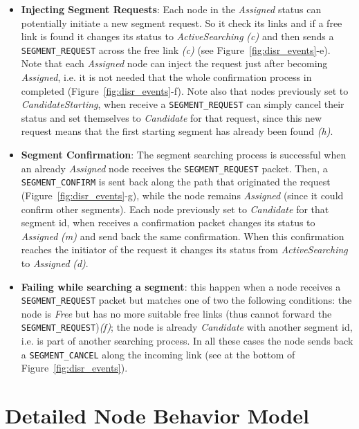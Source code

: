 \begin{itemize}
\item{\textbf{Injecting Segment Requests}}: Each node in the
\emph{Assigned} status can potentially initiate a new segment request.
So it check its links and if a free link is found it changes its
status to \emph{ActiveSearching} \emph{(c)} and then sends
a \texttt{SEGMENT\_REQUEST} across the free link \emph{(c)} (see
Figure~\ref{fig:disr_events}-e). 
Note that each \emph{Assigned} node can inject the request just after
becoming \emph{Assigned}, i.e. it is not needed that the whole confirmation
process in completed (Figure~\ref{fig:disr_events}-f).
Note also that nodes previously set to \emph{CandidateStarting}, when receive
a \texttt{SEGMENT\_REQUEST} can simply cancel their
status and set themselves to \emph{Candidate} for that request, since this new
request means that the first starting segment has already been found \emph{(h)}. 

\item{\textbf{Segment Confirmation}}: The segment searching process is
successful when an already \emph{Assigned} node receives the
\texttt{SEGMENT\_REQUEST} packet. Then, a \texttt{SEGMENT\_CONFIRM} is
sent back along the path that originated the request
(Figure~\ref{fig:disr_events}-g), while the node remains
\emph{Assigned} (since it could confirm other segments). Each node
previously set to \emph{Candidate} for that segment id, when receives
a confirmation packet changes its status to \emph{Assigned} \emph{(m)}
and send back the same confirmation. When this confirmation reaches the initiator of
the request it changes its status from \emph{ActiveSearching} to
\emph{Assigned} \emph{(d)}.

\item{\textbf{Failing while searching a segment}}: this happen when a node receives a \texttt{SEGMENT\_REQUEST} packet but
matches one of two the following conditions: the node is \emph{Free} but has no
more suitable free links (thus cannot forward the
\texttt{SEGMENT\_REQUEST})\emph{(f)}; the node
is already \emph{Candidate} with another segment id, i.e. is part of another searching process. In all these cases the node
sends back a \texttt{SEGMENT\_CANCEL} along the incoming link (see at
the bottom of Figure~\ref{fig:disr_events}).
\end{itemize}


\section{Detailed Node Behavior Model}
\label{sec:execution_model}

